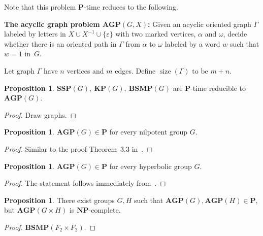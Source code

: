 \documentclass[10pt]{amsart}
\theoremstyle{definition}
\newtheorem{proposition}[theorem]{Proposition}
\DeclareMathOperator{\size}{{size}}
\def\P{{\mathbf{P}}}
\def\NP{{\mathbf{NP}}}
\def\SSP{{\mathbf{SSP}}}
\def\BSMP{{\mathbf{BSMP}}}
\def\KP{{\mathbf{KP}}}
\def\AGP{{\mathbf{AGP}}}
\begin{document}
\medskip
Note that this problem $\P$-time reduces to the following.

\medskip
\noindent
{\bf The acyclic graph problem $\AGP(G,X)$\index{$\AGP(G,X)$}:}
Given an acyclic oriented graph $\Gamma$ labeled by letters in $X\cup X^{-1}\cup \{\varepsilon\}$ with two marked vertices, $\alpha$ and $\omega$, decide whether there is an oriented path in $\Gamma$ from $\alpha$ to $\omega$ labeled by a word $w$ such that $w=1$ in~$G$.

\medskip
Let graph $\Gamma$ have $n$ vertices and $m$ edges. Define $\size(\Gamma)$ to be $m+n$.  
\begin{proposition}
$\SSP(G),\ \KP(G),\ \BSMP(G)$ are $\P$-time reducible to $\AGP(G)$.
\end{proposition}
\begin{proof} Draw graphs.
\end{proof}

\begin{proposition}
$\AGP(G)\in\P$ for every nilpotent group $G$.
\end{proposition}
\begin{proof}
Similar to the proof Theorem~3.3 in~\cite{Miasnikov-Nikolaev-Ushakov:2012}.
\end{proof}

\begin{proposition}
$\AGP(G)\in\P$ for every hyperbolic group $G$.
\end{proposition}
\begin{proof}
The statement follows immediately from~\cite[Proposition 5.5]{Miasnikov-Nikolaev-Ushakov:2012}.
\end{proof}


\begin{proposition}
There exist groups $G,H$ such that $\AGP(G),\AGP(H)\in\P$, but $\AGP(G\times H)$ is $\NP$-complete.
\end{proposition}
\begin{proof}
$\BSMP(F_2\times F_2)$.
\end{proof}
\end{document}
